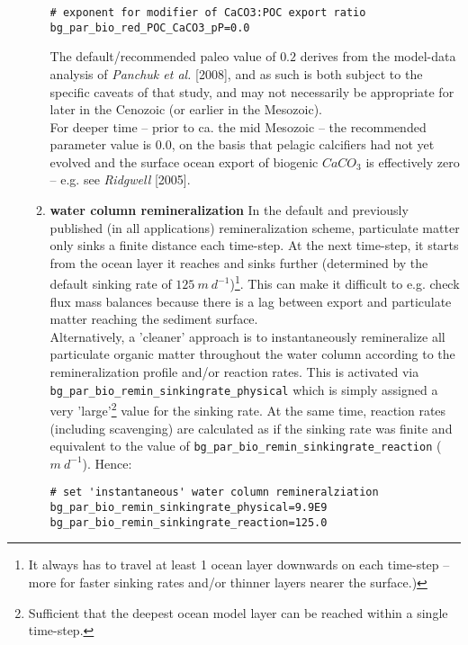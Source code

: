 \begin{itemize}[noitemsep]
\begin{enumerate}[noitemsep]
\begin{verbatim}
# exponent for modifier of CaCO3:POC export ratio
bg_par_bio_red_POC_CaCO3_pP=0.0
\end{verbatim}\vspace{-1mm}\normalsize
The default/recommended paleo value of \(0.2\) derives from the model-data analysis of \textit{Panchuk et al.} [2008], and as such is both subject to the specific caveats of that study, and may not necessarily be appropriate for later in the Cenozoic (or earlier in the Mesozoic).
\\For deeper time -- prior to ca. the mid Mesozoic -- the recommended parameter value is \(0.0\), on the basis that pelagic calcifiers had not yet evolved and the surface ocean export of biogenic \(CaCO_{3}\) is effectively zero -- e.g. see \textit{Ridgwell} [2005].
\vspace{1mm}
\item \textbf{water column remineralization}
In the default and previously published (in all applications) remineralization scheme, particulate matter only sinks a finite distance each time-step. At the next time-step, it starts from the ocean layer it reaches and sinks further (determined by the default sinking rate of \(125\:m\:d^{-1}\))\footnote{It always has to travel at least 1 ocean layer downwards on each time-step -- more for faster sinking rates and/or thinner layers nearer the surface.)}. This can make it difficult to e.g. check flux mass balances because there is a lag between export and particulate matter reaching the sediment surface.
\\Alternatively, a 'cleaner' approach is to instantaneously remineralize all particulate organic matter throughout the water column according to the remineralization profile and/or reaction rates. This is activated via \texttt{bg\_par\_bio\_remin\_sinkingrate\_physical} which is simply assigned a very 'large'\footnote{Sufficient that the deepest ocean model layer can be reached within a single time-step.} value for the sinking rate. At the same time, reaction rates (including scavenging) are calculated as if the sinking rate was finite and equivalent to the value of \texttt{bg\_par\_bio\_remin\_sinkingrate\_reaction} (\(m\:d^{-1}\)). Hence:
\small\vspace{-1mm}\begin{verbatim}
# set 'instantaneous' water column remineralziation
bg_par_bio_remin_sinkingrate_physical=9.9E9
bg_par_bio_remin_sinkingrate_reaction=125.0
\end{verbatim}\vspace{-1mm}\normalsize

\end{enumerate}
\end{itemize}
